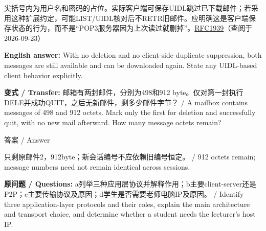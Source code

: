 尖括号内为用户名和密码的占位。实际客户端可保存UIDL跳过已下载邮件；若采用这种扩展约定，可能LIST/UIDL核对后不RETR旧邮件。应明确这是客户端保存状态的行为，而不是“POP3服务器因为上次读过就删掉”。\href{https://www.rfc-editor.org/rfc/rfc1939}{RFC1939}（查阅于2026-09-23）


\textbf{English answer:} With no deletion and no client-side duplicate suppression, both messages are still available and can be downloaded again. State any UIDL-based client behavior explicitly.


\textbf{变式 / Transfer:} 邮箱有两封邮件，分别为498和912 byte。仅对第一封执行DELE并成功QUIT，之后无新邮件，剩多少邮件字节？ / A mailbox contains messages of 498 and 912 octets. Mark only the first for deletion and successfully quit, with no new mail afterward. How many message octets remain?



\begin{StudySolution}{答案 / Answer}


只剩原邮件2，912byte；新会话编号不应依赖旧编号恒定。 / 912 octets remain; message numbers need not remain identical across sessions.


\end{StudySolution}






\begingroup
{}



\textbf{原问题 / Questions:} a列举三种应用层协议并解释作用；b主要client-server还是P2P；c主要传输协议及原因；d学生是否需要老师电脑IP及原因。 / Identify three application-layer protocols and their roles, explain the main architecture and transport choice, and determine whether a student needs the lecturer's host IP.




